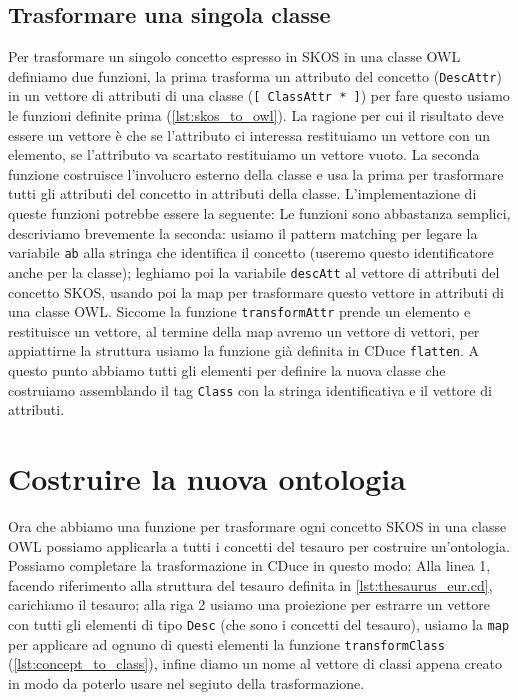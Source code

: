 \subsection{Trasformare una singola classe}
Per trasformare un singolo concetto espresso in SKOS in una classe OWL definiamo due funzioni, la prima trasforma un attributo del concetto (\verb|DescAttr|) in un vettore di attributi di una classe (\verb|[ ClassAttr * ]|) per fare questo usiamo le funzioni definite prima (\ref{lst:skos_to_owl}). La ragione per cui il risultato deve essere un vettore è che se l'attributo ci interessa restituiamo un vettore con un elemento, se l'attributo va scartato restituiamo un vettore vuoto. La seconda funzione costruisce l'involucro esterno della classe e usa la prima per trasformare tutti gli attributi del concetto in attributi della classe. L'implementazione di queste funzioni potrebbe essere la seguente:
Le funzioni sono abbastanza semplici, descriviamo brevemente la seconda: usiamo il pattern matching per legare la variabile \verb|ab| alla stringa che identifica il concetto (useremo questo identificatore anche per la classe); leghiamo poi la variabile \verb|descAtt| al vettore di attributi del concetto SKOS, usando poi la map per trasformare questo vettore in attributi di una classe OWL. Siccome la funzione \verb|transformAttr| prende un elemento e restituisce un vettore, al termine della map avremo un vettore di vettori, per appiattirne la struttura usiamo la funzione già definita in CDuce \verb|flatten|. A questo punto abbiamo tutti gli elementi per definire la nuova classe che costruiamo assemblando il tag \verb|Class| con la stringa identificativa e il vettore di attributi.
\section{Costruire la nuova ontologia}
Ora che abbiamo una funzione per trasformare ogni concetto SKOS in una classe OWL possiamo applicarla a tutti i concetti del tesauro per costruire un'ontologia. Possiamo completare la trasformazione in CDuce in questo modo:
Alla linea 1, facendo riferimento alla struttura del tesauro definita in \ref{lst:thesaurus_eur.cd}, carichiamo il tesauro; alla riga 2 usiamo una proiezione per estrarre un vettore con tutti gli elementi di tipo \verb|Desc| (che sono i concetti del tesauro), usiamo la \verb|map| per applicare ad ognuno di questi elementi la funzione \verb|transformClass| (\ref{lst:concept_to_class}), infine diamo un nome al vettore di classi appena creato in modo da poterlo usare nel segiuto della trasformazione.

